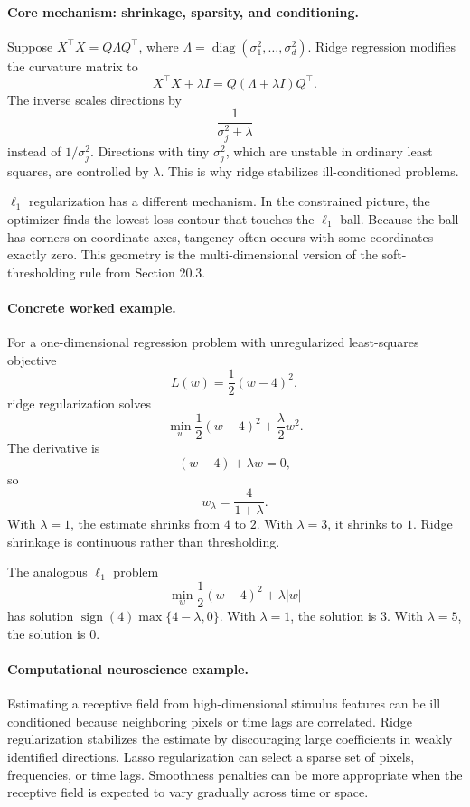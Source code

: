 \paragraph{Core mechanism: shrinkage, sparsity, and conditioning.}
Suppose \(X^\top X=Q\Lambda Q^\top\), where \(\Lambda=\operatorname{diag}(\sigma_1^2,\ldots,\sigma_d^2)\). Ridge regression modifies the curvature matrix to
\[
X^\top X+\lambda I
=Q(\Lambda+\lambda I)Q^\top.
\]
The inverse scales directions by
\[
\frac{1}{\sigma_j^2+\lambda}
\]
instead of \(1/\sigma_j^2\). Directions with tiny \(\sigma_j^2\), which are unstable in ordinary least squares, are controlled by \(\lambda\). This is why ridge stabilizes ill-conditioned problems.

\(\ell_1\) regularization has a different mechanism. In the constrained picture, the optimizer finds the lowest loss contour that touches the \(\ell_1\) ball. Because the ball has corners on coordinate axes, tangency often occurs with some coordinates exactly zero. This geometry is the multi-dimensional version of the soft-thresholding rule from Section 20.3.

\paragraph{Concrete worked example.}
For a one-dimensional regression problem with unregularized least-squares objective
\[
L(w)=\frac12(w-4)^2,
\]
ridge regularization solves
\[
\min_w \frac12(w-4)^2+\frac{\lambda}{2}w^2.
\]
The derivative is
\[
(w-4)+\lambda w=0,
\]
so
\[
w_\lambda=\frac{4}{1+\lambda}.
\]
With \(\lambda=1\), the estimate shrinks from \(4\) to \(2\). With \(\lambda=3\), it shrinks to \(1\). Ridge shrinkage is continuous rather than thresholding.

The analogous \(\ell_1\) problem
\[
\min_w \frac12(w-4)^2+\lambda |w|
\]
has solution \(\operatorname{sign}(4)\max\{4-\lambda,0\}\). With \(\lambda=1\), the solution is \(3\). With \(\lambda=5\), the solution is \(0\).

\paragraph{Computational neuroscience example.}
Estimating a receptive field from high-dimensional stimulus features can be ill conditioned because neighboring pixels or time lags are correlated. Ridge regularization stabilizes the estimate by discouraging large coefficients in weakly identified directions. Lasso regularization can select a sparse set of pixels, frequencies, or time lags. Smoothness penalties can be more appropriate when the receptive field is expected to vary gradually across time or space.

